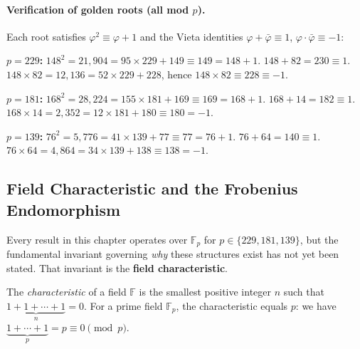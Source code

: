 \paragraph{Verification of golden roots (all mod $p$).}
Each root satisfies $\varphi^2 \equiv \varphi + 1$ and the Vieta identities
$\varphi + \bar\varphi \equiv 1$, $\varphi \cdot \bar\varphi \equiv -1$:

\medskip
\noindent\textbf{$p = 229$:}
$148^2 = 21{,}904 = 95 \times 229 + 149 \equiv 149 = 148 + 1$.
$148 + 82 = 230 \equiv 1$.
$148 \times 82 = 12{,}136 = 52 \times 229 + 228$,
hence $148 \times 82 \equiv 228 \equiv -1$.

\medskip
\noindent\textbf{$p = 181$:}
$168^2 = 28{,}224 = 155 \times 181 + 169 \equiv 169 = 168 + 1$.
$168 + 14 = 182 \equiv 1$.
$168 \times 14 = 2{,}352 = 12 \times 181 + 180 \equiv 180 = -1$.

\medskip
\noindent\textbf{$p = 139$:}
$76^2 = 5{,}776 = 41 \times 139 + 77 \equiv 77 = 76 + 1$.
$76 + 64 = 140 \equiv 1$.
$76 \times 64 = 4{,}864 = 34 \times 139 + 138 \equiv 138 = -1$.

\subsection{Field Characteristic and the Frobenius Endomorphism}
\label{sec:characteristic}

Every result in this chapter operates over $\mathbb{F}_p$ for $p \in \{229, 181, 139\}$, but the fundamental invariant governing \emph{why} these structures exist has not yet been stated. That invariant is the \textbf{field characteristic}.

\begin{definition}
The \emph{characteristic} of a field $\mathbb{F}$ is the smallest positive integer $n$ such that $\underbrace{1 + 1 + \cdots + 1}_{n} = 0$. For a prime field $\mathbb{F}_p$, the characteristic equals $p$: we have $\underbrace{1 + \cdots + 1}_{p} = p \equiv 0 \pmod{p}$.
\end{definition}

